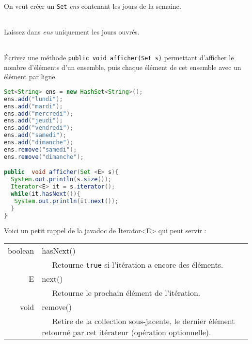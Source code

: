 \documentclass[iutinfo,a4paper,nocorrections,10pt]{ustl-tdtp}
\begin{document}
%




~\\ \question On veut créer un \texttt{Set} {\it ens}  contenant les jours de la semaine. 

~\\ \question Laissez dans {\it ens} uniquement les jours ouvrés. 

~\\ \question Écrivez une méthode \texttt{public void afficher(Set s)} permettant d'afficher le nombre d'éléments d'un ensemble, puis chaque élément de cet ensemble avec un élément par ligne.

\begin{correction}
{\color{red}
\begin{lstlisting}[language=Java]
Set<String> ens = new HashSet<String>();
ens.add("lundi"); 
ens.add("mardi");
ens.add("mercredi");
ens.add("jeudi");
ens.add("vendredi");
ens.add("samedi");
ens.add("dimanche");
ens.remove("samedi");
ens.remove("dimanche");

public  void afficher(Set <E> s){
  System.out.println(s.size());
  Iterator<E> it = s.iterator();
  while(it.hasNext()){
   System.out.println(it.next());
  }
}
\end{lstlisting}
}

\end{correction}


Voici un petit rappel de la javadoc de Iterator<E> qui peut servir :
 \begin{center}
\begin{tabular}{|r|l|}
\hline
 boolean & hasNext()  \\
         & ~~ Retourne \texttt{true} si l'itération a encore des éléments.  \\
\hline
 E & next()  \\
          & ~~ Retourne le prochain élément de l'itération.  \\
\hline
 void &	remove()  \\
        & ~~ Retire de la collection sous-jacente, le dernier élément retourné par cet itérateur (opération optionnelle).\\


\hline
\end{tabular}
\end{center}
\end{document}
